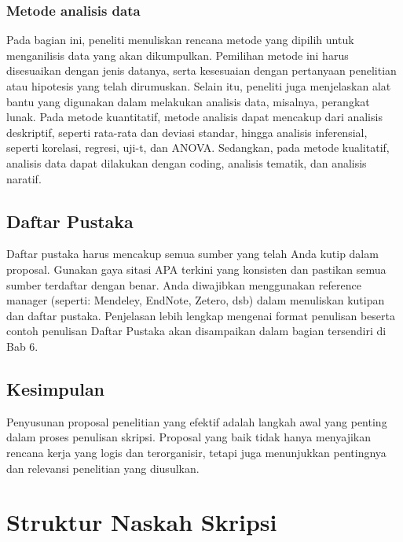 \documentclass[
  indonesian,
  letterpaper,
]{scrbook}
\begin{document}
\subsection{Metode analisis data}\label{metode-analisis-data}

Pada bagian ini, peneliti menuliskan rencana metode yang dipilih untuk
menganilisis data yang akan dikumpulkan. Pemilihan metode ini harus
disesuaikan dengan jenis datanya, serta kesesuaian dengan pertanyaan
penelitian atau hipotesis yang telah dirumuskan. Selain itu, peneliti
juga menjelaskan alat bantu yang digunakan dalam melakukan analisis
data, misalnya, perangkat lunak. Pada metode kuantitatif, metode
analisis dapat mencakup dari analisis deskriptif, seperti rata-rata dan
deviasi standar, hingga analisis inferensial, seperti korelasi, regresi,
uji-t, dan ANOVA. Sedangkan, pada metode kualitatif, analisis data dapat
dilakukan dengan coding, analisis tematik, dan analisis naratif.

\section{Daftar Pustaka}\label{daftar-pustaka}

Daftar pustaka harus mencakup semua sumber yang telah Anda kutip dalam
proposal. Gunakan gaya sitasi APA terkini yang konsisten dan pastikan
semua sumber terdaftar dengan benar. Anda diwajibkan menggunakan
reference manager (seperti: Mendeley, EndNote, Zetero, dsb) dalam
menuliskan kutipan dan daftar pustaka. Penjelasan lebih lengkap mengenai
format penulisan beserta contoh penulisan Daftar Pustaka akan
disampaikan dalam bagian tersendiri di Bab 6.

\section*{Kesimpulan}\label{kesimpulan-2}


Penyusunan proposal penelitian yang efektif adalah langkah awal yang
penting dalam proses penulisan skripsi. Proposal yang baik tidak hanya
menyajikan rencana kerja yang logis dan terorganisir, tetapi juga
menunjukkan pentingnya dan relevansi penelitian yang diusulkan.


\chapter{Struktur Naskah Skripsi}\label{struktur-naskah-skripsi}
\end{document}
